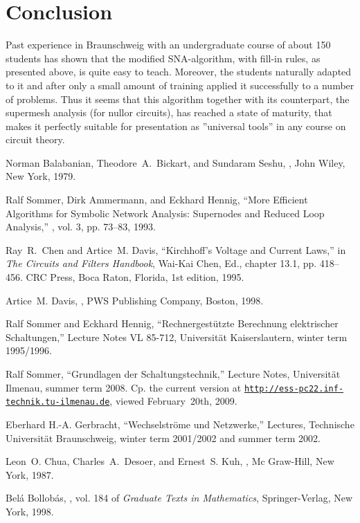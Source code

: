 \documentclass[10pt,journal,twocolumn,pagenumbers]{IEEEtran}
\begin{document}
\section{Conclusion}
Past experience in Braunschweig with an undergraduate course of about 150 students \cite{GerbrachtVL} has shown that the modified SNA-algorithm, with fill-in rules, as presented above, is quite easy to teach. Moreover, the students naturally adapted to it and after only a small amount of training applied it successfully to a number of problems. Thus it seems that this algorithm together with its counterpart, the supermesh analysis (for nullor circuits), has reached a state of maturity, that makes it perfectly suitable for presentation as ''universal tools'' in any course on circuit theory.



\begin{thebibliography}{1}
{\small
{}
Norman Balabanian, Theodore~A.\ Bickart, and Sundaram Seshu,
,
\newblock John Wiley, New York, 1979.

Ralf Sommer, Dirk Ammermann, and Eckhard Hennig,
\newblock ``More {E}fficient {A}lgorithms for {S}ymbolic {N}etwork {A}nalysis:
  {S}upernodes and {R}educed {L}oop {A}nalysis,''
, vol. 3, pp.
  73--83, 1993.

Ray~R.\ Chen and Artice~M. Davis,
\newblock ``Kirchhoff's {V}oltage and {C}urrent {L}aws,''
\newblock in {\em The Circuits and Filters Handbook}, Wai-Kai Chen, Ed.,
  chapter 13.1, pp. 418--456. CRC Press, Boca Raton, Florida, 1st edition,
  1995.

Artice~M. Davis,
,
\newblock PWS Publishing Company, Boston, 1998.

Ralf Sommer and Eckhard Hennig,
\newblock ``Rechnergest\"utzte {B}erechnung elektrischer {S}chaltungen,''
\newblock Lecture Notes VL 85-712, Universit\"at Kaiserslautern, winter term 1995/1996.

Ralf Sommer,
\newblock ``Grundlagen der {S}chaltungstechnik,''
\newblock Lecture Notes, Universit\"at Ilmenau, summer term 2008.
\newblock Cp. the current version at \href{http://ess-pc22.inf-technik.tu-ilmenau.de}{\tt http://ess-pc22.inf-technik.}\linebreak\href{http://ess-pc22.inf-technik.tu-ilmenau.de}{\tt tu-ilmenau.de}, viewed February~20th, 2009.

Eberhard H.-A. Gerbracht,
\newblock ``Wechselstr\"ome und {N}etz\-werke,''
\newblock Lectures, Technische Universit\"at Braunschweig, winter term
  2001/2002 and summer term 2002.

Leon~O. Chua, Charles~A.\ Desoer, and Ernest~S. Kuh,
,
\newblock Mc Graw-Hill, New York, 1987.

Bel\'a Bollob\'as,
, vol. 184 of {\em Graduate Texts in
  Mathematics},
\newblock Springer-Verlag, New York, 1998.
}
\end{thebibliography}
\end{document}
